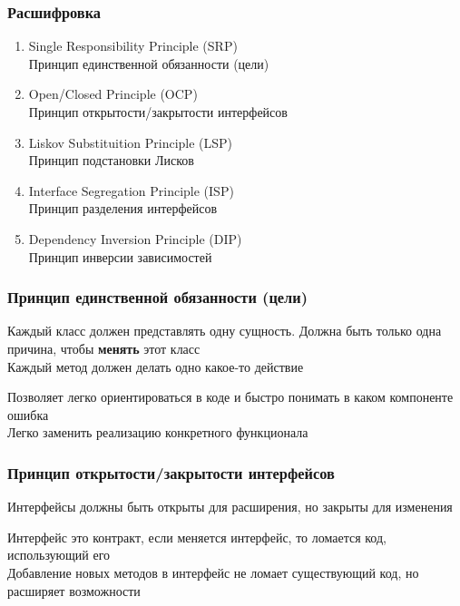 \documentclass[russian,aspectratio=169,14pt]{beamer}
\begin{document}
\begin{frame}
	\frametitle{Расшифровка}
	\begin{enumerate}
		\item Single Responsibility Principle (SRP)\\
		Принцип единственной обязанности (цели)
		\item Open/Closed Principle (OCP)\\
		Принцип открытости/закрытости интерфейсов
		\item Liskov Substituition Principle (LSP)\\
		Принцип подстановки Лисков
		\item Interface Segregation Principle (ISP)\\
		Принцип разделения интерфейсов
		\item Dependency Inversion Principle (DIP)\\
		Принцип инверсии зависимостей
	\end{enumerate}
\end{frame}

\begin{frame}
	\frametitle{Принцип единственной обязанности (цели)}
	\begin{minipage}{1.0\textwidth}
	Каждый класс должен представлять одну сущность. Должна быть только одна причина, чтобы \textbf{менять} этот класс\\
	Каждый метод должен делать одно какое-то действие\\
	\end{minipage}
	\begin{minipage}{1.0\textwidth}
	Позволяет легко ориентироваться в коде и быстро понимать в каком компоненте ошибка\\
	Легко заменить реализацию конкретного функционала
	\end{minipage}
\end{frame}

\begin{frame}
	\frametitle{Принцип открытости/закрытости интерфейсов}
	\begin{minipage}{1.0\textwidth}
	Интерфейсы должны быть открыты для расширения, но закрыты для изменения\\
	\end{minipage}
	\begin{minipage}{1.0\textwidth}
	Интерфейс это контракт, если меняется интерфейс, то ломается код, использующий его\\
	Добавление новых методов в интерфейс не ломает существующий код, но расширяет возможности
	\end{minipage}
\end{frame}
\end{document}
